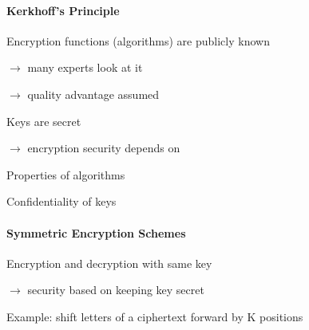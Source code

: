 \documentclass[a4paper]{article}
\begin{document}
\begin{multicols}{3}
    \paragraph{Kerkhoff’s Principle}
    \begin{enumerate*}
        \item Encryption functions (algorithms) are publicly known
        \begin{itemize*}
            \item[$\rightarrow$] many experts look at it
            \item[$\rightarrow$] quality advantage assumed
        \end{itemize*}
        \item Keys are secret
        \begin{itemize*}
            \item[$\rightarrow$] encryption security depends on
            \item Properties of algorithms
            \item Confidentiality of keys
        \end{itemize*}
    \end{enumerate*}

    \paragraph{Symmetric Encryption Schemes}
    \begin{itemize*}
        \item Encryption and decryption with same key
        \item[$\rightarrow$] security based on keeping key secret
        \item Example: shift letters of a ciphertext forward by K positions
    \end{itemize*}


\end{multicols}
\end{document}
